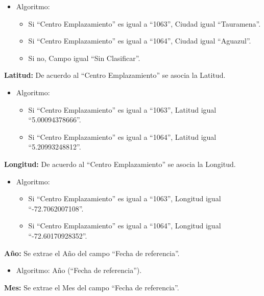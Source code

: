 \documentclass[
  11pt,
  bookmarksnumbered]{article}
\providecommand{\tightlist}{%
  \setlength{\itemsep}{0pt}\setlength{\parskip}{0pt}}
\begin{document}
\begin{itemize}
\item
  Algoritmo:

  \begin{itemize}
  \item
    Si ``Centro Emplazamiento'' es igual a ``1063'', Ciudad igual ``Tauramena''.
  \item
    Si ``Centro Emplazamiento'' es igual a ``1064'', Ciudad igual ``Aguazul''.
  \item
    Si no, Campo igual ``Sin Clasificar''.
  \end{itemize}
\end{itemize}

\textbf{Latitud:} De acuerdo al ``Centro Emplazamiento'' se asocia la Latitud.

\begin{itemize}
\item
  Algoritmo:

  \begin{itemize}
  \item
    Si ``Centro Emplazamiento'' es igual a ``1063'', Latitud igual ``5.00094378666''.
  \item
    Si ``Centro Emplazamiento'' es igual a ``1064'', Latitud igual ``5.20993248812''.
  \end{itemize}
\end{itemize}

\textbf{Longitud:} De acuerdo al ``Centro Emplazamiento'' se asocia la Longitud.

\begin{itemize}
\item
  Algoritmo:

  \begin{itemize}
  \item
    Si ``Centro Emplazamiento'' es igual a ``1063'', Longitud igual ``-72.7062007108''.
  \item
    Si ``Centro Emplazamiento'' es igual a ``1064'', Longitud igual ``-72.60170928352''.
  \end{itemize}
\end{itemize}

\textbf{Año:} Se extrae el Año del campo ``Fecha de referencia''.

\begin{itemize}
\tightlist
\item
  Algoritmo: Año (``Fecha de referencia'').
\end{itemize}

\textbf{Mes:} Se extrae el Mes del campo ``Fecha de referencia''.
\end{document}
